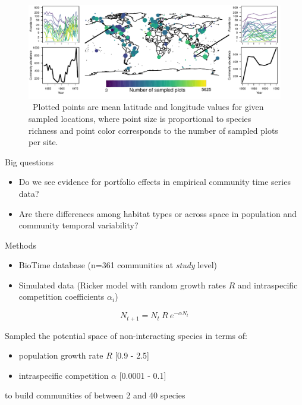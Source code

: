 \documentclass[final,hyperref={pdfpagelabels=false}]{beamer}
\begin{document}
\begin{frame}[t]
\begin{columns}[t]
\begin{column}{0.46\textwidth}
		\begin{figure}
			\includegraphics[width=\linewidth]{figures/conceptFigure.pdf}
			\caption{ \ Plotted points are mean latitude and longitude values for given sampled locations, where point size is proportional to species richness and point color corresponds to the number of sampled plots per site. }
		\end{figure}



	\begin{block}{Big questions}

		\begin{itemize}
			\item Do we see evidence for portfolio effects in empirical community time series data?
			\item Are there differences among habitat types or across space in population and community temporal variability?
		\end{itemize}
	\end{block}



\begin{alertblock}{Methods}
	\begin{itemize}
		\item BioTime database (n=361 communities at \textit{study} level)
		\item Simulated data (Ricker model with random growth rates $R$ and intraspecific competition coefficients $\alpha_i$)
	\end{itemize}

  \begin{equation}
  \label{eq:ricker}
  N_{t+1} = N_{t} \ R \ e^{- \alpha N_{t}}
  \end{equation}

 Sampled the potential space of non-interacting species in terms of: 
 \begin{itemize}
   \item population growth rate $R$ [0.9 - 2.5] 
   \item intraspecific competition $\alpha$ [0.0001 - 0.1] 
 \end{itemize}
 to build communities of between 2 and 40 species
\end{alertblock}









\end{column}
\end{columns}
\end{frame}
\end{document}
